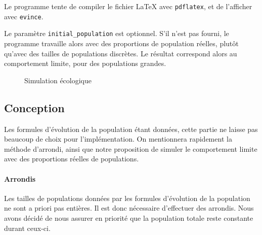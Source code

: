 \documentclass[10pt]{article}
\begin{document}
Le programme tente de compiler le fichier \LaTeX{} avec \verb|pdflatex|, et de l'afficher avec \verb|evince|.

Le paramètre \verb|initial_population| est optionnel. S'il n'est pas fourni, le programme travaille
alors avec des proportions de population réelles, plutôt qu'avec des tailles de populations discrètes.
Le résultat correspond alors au comportement limite, pour des populations grandes.

\begin{figure}
\caption{Simulation écologique}
\label{sim_plot}
\begin{center}
\end{center}
\end{figure}

\subsection{Conception}
Les formules d'évolution de la population étant données, cette partie ne laisse pas beaucoup de choix pour l'implémentation.
On mentionnera rapidement la méthode d'arrondi, ainsi que notre proposition de simuler le comportement limite avec
des proportions réelles de populations.

\paragraph{Arrondis}
Les tailles de populations données par les formules d'évolution de la population ne sont a priori pas entières.
Il est donc nécessaire d'effectuer des arrondis.
Nous avons décidé de nous assurer en priorité que la population totale reste constante durant ceux-ci.
\end{document}
